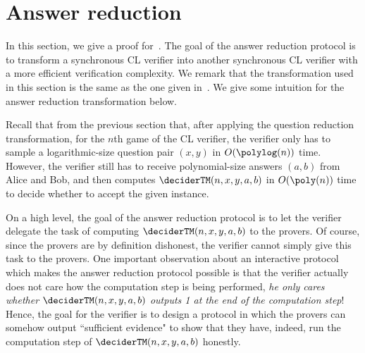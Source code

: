 
\section{Answer reduction} \label{sec:PCPanswerreduction}

In this section, we give a proof for~. The goal of the answer reduction protocol is to transform a synchronous CL verifier into another synchronous CL verifier with a more efficient verification complexity. We remark that the transformation used in this section is the same as the one given in~\cite[Section 10]{jiMIPRE2022a}. We give some intuition for the answer reduction transformation below.

Recall that from the previous section that, after applying the question reduction transformation, for the $n$th game of the CL verifier, the verifier only has to sample a logarithmic-size question pair $(x,y)$ in $O(\polylog(n))$ time. However, the verifier still has to receive polynomial-size answers $(a,b)$ from Alice and Bob, and then computes $\deciderTM(n,x,y,a,b)$ in $O(\poly(n))$ time to decide whether to accept the given instance. 

On a high level, the goal of the answer reduction protocol is to let the verifier delegate the task of computing $\deciderTM(n,x,y,a,b)$ to the provers. Of course, since the provers are by definition dishonest, the verifier cannot simply give this task to the provers. One important observation about an interactive protocol which makes the answer reduction protocol possible is that the verifier actually does not care how the computation step is being performed, \textit{he only cares whether $\deciderTM(n,x,y,a,b)$ outputs 1 at the end of the computation step}! Hence, the goal for the verifier is to design a protocol in which the provers can somehow output ``sufficient evidence" to show that they have, indeed, run the computation step of  $\deciderTM(n,x,y,a,b)$ honestly. 

